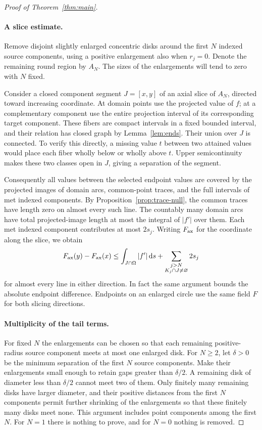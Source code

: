 \begin{proof}[Proof of Theorem~\ref{thm:main}]
\paragraph{A slice estimate.}
Remove disjoint slightly enlarged concentric disks around the first
$N$ indexed source components, using a positive enlargement also when
$r_j=0$.  Denote the remaining round region by $A_N$.  The sizes of
the enlargements will tend to zero with $N$ fixed.

Consider a closed component segment $J=[x,y]$ of an axial slice of
$A_N$, directed toward increasing coordinate.  At domain points use
the projected value of $f$; at a complementary component use the
entire projection interval of its corresponding target component.
These fibers are compact intervals in a fixed bounded interval, and
their relation has closed graph by Lemma~\ref{lem:ends}.  Their union
over $J$ is connected.  To verify this directly, a missing value $t$
between two attained values would place each fiber wholly below or
wholly above $t$.  Upper semicontinuity makes these two classes open
in $J$, giving a separation of the segment.

Consequently all values between the selected endpoint values are
covered by the projected images of domain arcs, common-point traces,
and the full intervals of met indexed components.  By
Proposition~\ref{prop:trace-null}, the common traces have length zero
on almost every such line.  The countably many domain arcs have
total projected-image length at most the integral of $|f'|$ over
them.  Each met indexed component contributes at most $2s_j$.
Writing $F_{\rm ax}$ for the coordinate along the slice, we obtain
\begin{equation}\label{eq:slice-estimate}
 F_{\rm ax}(y)-F_{\rm ax}(x)
 \le \int_{J\cap\Omega}|f'|\,\mathrm d s
       +\sum_{\substack{j>N\\K_j\cap J\ne\varnothing}}2s_j
\end{equation}
for almost every line in either direction.  In fact the same argument
bounds the absolute endpoint difference.  Endpoints on an enlarged
circle use the same field $F$ for both slicing directions.

\paragraph{Multiplicity of the tail terms.}
For fixed $N$ the enlargements can be chosen so that each remaining
positive-radius source component meets at most one enlarged disk.
For $N\ge2$, let $\delta>0$ be the minimum separation of the first
$N$ source components.  Make their enlargements small enough to
retain gaps greater than $\delta/2$.  A remaining disk of diameter
less than $\delta/2$ cannot meet two of them.  Only finitely many
remaining disks have larger diameter, and their positive distances
from the first $N$ components permit further shrinking of the
enlargements so that these finitely many disks meet none.  This
argument includes point components among the first $N$.  For $N=1$
there is nothing to prove, and for $N=0$ nothing is removed.


\end{proof}
